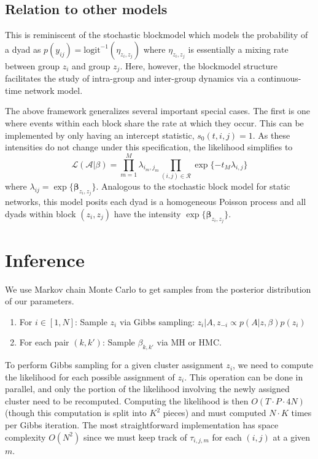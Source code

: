 \documentclass[11pt]{article}
\begin{document}
\subsection{Relation to other models}

This is reminiscent of the stochastic blockmodel \cite{Nowicki2001,Kemp} which models the probability of a dyad as $p(y_{ij}) =\mbox{logit}^{-1}( \eta_{z_i,z_j})$ where $\eta_{z_i,z_j}$ is essentially a mixing rate between group $z_i$ and group $z_j$.  Here, however, the blockmodel structure facilitates the study of intra-group and inter-group dynamics via a continuous-time network model.

The above framework generalizes several important special cases.  The first is one where events within each block share the rate at which they occur.  This can be implemented by only having an intercept statistic, $s_0(t,i,j) = 1$.  As these intensities do not change under this specification, the likelihood simplifies to 
$$\mathcal{L}(\mathcal{A}|\beta) = \prod_{m=1}^M \lambda_{i_m,j_m} \prod_{(i,j) \in \mathcal{R}} \exp\{-t_M \lambda_{i,j}\}$$
where $ \lambda_{ij} = \exp\{\boldsymbol{\beta}_{z_i,z_j}\}$.  Analogous to the stochastic block model for static networks, this model posits each dyad is a homogeneous Poisson process and all dyads within block $(z_i,z_j)$ have the intensity $\exp\{\boldsymbol{\beta}_{z_i,z_j}\}$.


\section{Inference}

We use Markov chain Monte Carlo to get samples from the posterior distribution of our parameters.  

\begin{enumerate}
\item For $i \in [1,N]$: Sample $z_i$ via Gibbs sampling: 
$z_i | A, z_{-i} \propto p(A|z,\beta) p(z_i)$
\item For each pair $(k,k')$: Sample $\beta_{k,k'}$ via MH or HMC.
\end{enumerate}

To perform Gibbs sampling for a given cluster assignment $z_i$, we need to compute the likelihood for each possible assignment of $z_i$. 
This operation can be done in parallel, and only the portion of the likelihood involving the newly assigned cluster  need to be recomputed.  Computing the likelihood is then $O(T \cdot P \cdot 4N)$ (though this computation is split into $K^2$ pieces) and must computed $N \cdot K$ times per Gibbs iteration.  The most straightforward implementation has space complexity $O(N^2)$ since we must keep track of $\tau_{i,j,m}$ for each $(i,j)$ at a given $m$.
\end{document}
